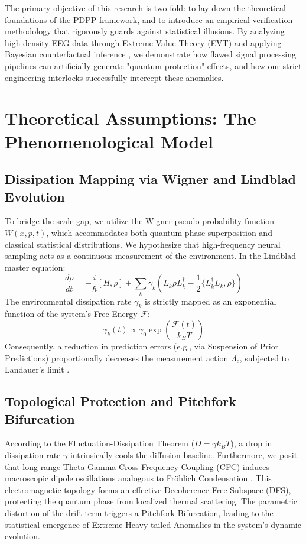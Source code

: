 \documentclass[10pt,twocolumn,letterpaper]{article}
\begin{document}
The primary objective of this research is two-fold: to lay down the theoretical foundations of the PDPP framework, and to introduce an empirical verification methodology that rigorously guards against statistical illusions. By analyzing high-density EEG data through Extreme Value Theory (EVT) and applying Bayesian counterfactual inference \cite{Pearl2009}, we demonstrate how flawed signal processing pipelines can artificially generate "quantum protection" effects, and how our strict engineering interlocks successfully intercept these anomalies.

\section{Theoretical Assumptions: The Phenomenological Model}

\subsection{Dissipation Mapping via Wigner and Lindblad Evolution}
To bridge the scale gap, we utilize the Wigner pseudo-probability function $W(x, p, t)$, which accommodates both quantum phase superposition and classical statistical distributions. We hypothesize that high-frequency neural sampling acts as a continuous measurement of the environment. In the Lindblad master equation:
\begin{equation}
\frac{d\rho}{dt} = -\frac{i}{\hbar}[H, \rho] + \sum_k \gamma_k \left( L_k \rho L_k^\dagger - \frac{1}{2}\{L_k^\dagger L_k, \rho\} \right)
\end{equation}
The environmental dissipation rate $\gamma_k$ is strictly mapped as an exponential function of the system's Free Energy $\mathcal{F}$:
\begin{equation}
\gamma_k(t) \propto \gamma_0 \exp\left(\frac{\mathcal{F}(t)}{k_B T}\right)
\end{equation}
Consequently, a reduction in prediction errors (e.g., via Suspension of Prior Predictions) proportionally decreases the measurement action $\Lambda_c$, subjected to Landauer's limit \cite{Landauer1961}.

\subsection{Topological Protection and Pitchfork Bifurcation}
According to the Fluctuation-Dissipation Theorem ($D = \gamma k_B T$), a drop in dissipation rate $\gamma$ intrinsically cools the diffusion baseline. Furthermore, we posit that long-range Theta-Gamma Cross-Frequency Coupling (CFC) induces macroscopic dipole oscillations analogous to Fr\"ohlich Condensation \cite{Frohlich1968}. This electromagnetic topology forms an effective Decoherence-Free Subspace (DFS), protecting the quantum phase from localized thermal scattering. The parametric distortion of the drift term triggers a Pitchfork Bifurcation, leading to the statistical emergence of Extreme Heavy-tailed Anomalies in the system's dynamic evolution.
\end{document}

